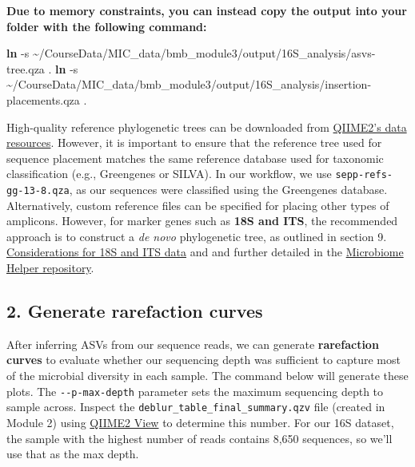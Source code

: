 \documentclass[
]{book}
\newenvironment{Shaded}{\begin{snugshade}}{\end{snugshade}}
\newcommand{\AttributeTok}[1]{\textcolor[rgb]{0.13,0.29,0.53}{#1}}
\newcommand{\FunctionTok}[1]{\textcolor[rgb]{0.13,0.29,0.53}{\textbf{#1}}}
\newcommand{\NormalTok}[1]{#1}
\begin{document}
\textbf{Due to memory constraints, you can instead copy the output into your folder with the following command:}

\begin{Shaded}
\begin{Highlighting}[]
\FunctionTok{ln} \AttributeTok{{-}s}\NormalTok{ \textasciitilde{}/CourseData/MIC\_data/bmb\_module3/output/16S\_analysis/asvs{-}tree.qza .}
\FunctionTok{ln} \AttributeTok{{-}s}\NormalTok{ \textasciitilde{}/CourseData/MIC\_data/bmb\_module3/output/16S\_analysis/insertion{-}placements.qza .}
\end{Highlighting}
\end{Shaded}

High-quality reference phylogenetic trees can be downloaded from \href{https://docs.qiime2.org/2024.10/data-resources/}{QIIME2's data resources}. However, it is important to ensure that the reference tree used for sequence placement matches the same reference database used for taxonomic classification (e.g., Greengenes or SILVA). In our workflow, we use \texttt{sepp-refs-gg-13-8.qza}, as our sequences were classified using the Greengenes database. Alternatively, custom reference files can be specified for placing other types of amplicons. However, for marker genes such as \textbf{18S and ITS}, the recommended approach is to construct a \emph{de novo} phylogenetic tree, as outlined in section 9. \hyperref[9-considerations-for-18s-and-its-data]{Considerations for 18S and ITS data} and and further detailed in the \href{https://github.com/LangilleLab/microbiome_helper/wiki/Amplicon-SOP-v2-(qiime2-2022.11)}{Microbiome Helper repository}.

\subsection{2. Generate rarefaction curves}\label{rarefaction-curves}

After inferring ASVs from our sequence reads, we can generate \textbf{rarefaction curves} to evaluate whether our sequencing depth was sufficient to capture most of the microbial diversity in each sample. The command below will generate these plots. The \texttt{-\/-p-max-depth} parameter sets the maximum sequencing depth to sample across. Inspect the \texttt{deblur\_table\_final\_summary.qzv} file (created in Module 2) using \href{https://view.qiime2.org/}{QIIME2 View} to determine this number. For our 16S dataset, the sample with the highest number of reads contains 8,650 sequences, so we'll use that as the max depth.
\end{document}
